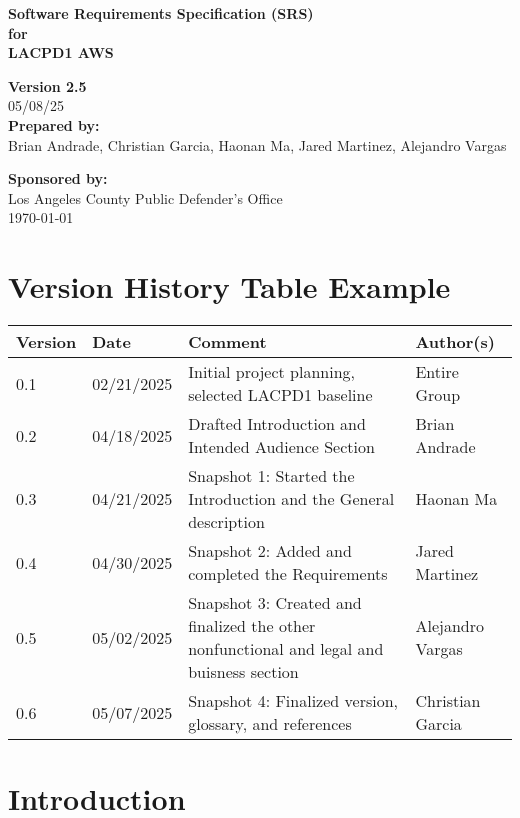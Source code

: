\documentclass[12pt]{article}
\begin{document}
\begin{titlepage}
    \centering
    \vspace*{2cm}

    {\Huge\bfseries Software Requirements Specification (SRS)\\
    for\\
    LACPD1 AWS\\}

    \textbf{Version 2.5}\\
    05/08/25\\

    \textbf{Prepared by:}\\
    Brian Andrade, Christian Garcia, Haonan Ma, Jared Martinez, Alejandro Vargas

    \textbf{Sponsored by:}\\
    Los Angeles County Public Defender's Office\\

    \vfill
    {\large \today}
\end{titlepage}

\tableofcontents
\setcounter{tocdepth}{3}  


\newpage

\section*{Version History Table Example}
\begin{longtable}{|l|l|p{8cm}|l|}
\hline
\textbf{Version} & \textbf{Date} & \textbf{Comment} & \textbf{Author(s)} \\
\hline
0.1 & 02/21/2025 & Initial project planning, selected LACPD1 baseline & Entire Group \\
0.2 & 04/18/2025 & Drafted Introduction and Intended Audience Section & Brian Andrade \\
0.3 & 04/21/2025 & Snapshot 1: Started the Introduction and the General description & Haonan Ma \\
0.4 & 04/30/2025 & Snapshot 2: Added and completed the Requirements  & Jared Martinez \\
0.5 & 05/02/2025 & Snapshot 3: Created and finalized the other nonfunctional and legal and buisness section  & Alejandro Vargas \\
0.6 & 05/07/2025 & Snapshot 4: Finalized version, glossary, and references & Christian Garcia \\
\hline
\end{longtable}

\section{Introduction}
\end{document}
